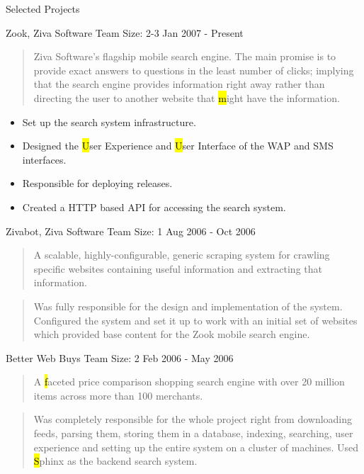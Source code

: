 \documentclass{resume}
\newcommand{\teamsize}{\hfill\sc\footnotesize Team Size: }
\begin{document}
\begin{category}{Selected Projects}{}
    \item {\topic Zook,} Ziva Software
        {\teamsize 2-3}
        {\period Jan 2007 - Present}
        \begin{quote}
            Ziva Software's flagship mobile search engine.  The main promise is to
            provide exact answers to questions in the least number of clicks;
            implying that the search engine provides information right away rather
            than directing the user to another website that {\hl might} have the
            information.
        \end{quote}

            \begin{itemize}
                \item Set up the search system infrastructure.
                \item Designed the {\hl User Experience} and {\hl User Interface}
                    of the WAP and SMS interfaces.
                \item Responsible for deploying releases.
                \item Created a HTTP based API for accessing the search system.
            \end{itemize}

    \pagebreak

    \item {\topic Zivabot,} Ziva Software
        {\teamsize 1}
        {\period Aug 2006 - Oct 2006}
        \begin{quote}
            A scalable, highly-configurable, generic scraping system for crawling
            specific websites containing useful information and extracting that
            information.
        \end{quote}
        \begin{quote}
            Was fully responsible for the design and implementation of the system.
            Configured the system and set it up to work with an initial set of
            websites which provided base content for the Zook mobile search engine.
        \end{quote}

    \item {\topic Better Web Buys}
        {\teamsize 2}
        {\period Feb 2006 - May 2006}
        \begin{quote}
            A {\hl faceted price comparison shopping search engine} with over 20
            million items across more than 100 merchants.
        \end{quote}
        \begin{quote}
            Was completely responsible for the whole project right from downloading
            feeds, parsing them, storing them in a database, indexing, searching,
            user experience and setting up the entire system on a cluster of
            machines. Used {\hl Sphinx} as the backend search system.
        \end{quote}


\end{category}
\end{document}
